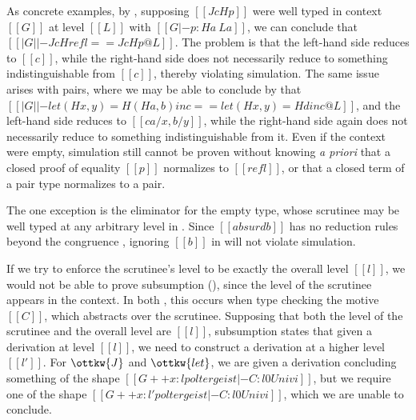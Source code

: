 \documentclass[acmsmall, screen=true, nonacm=true,
  review=\ifpublic false\else true\fi,
  anonymous=\ifanonymous true\else false\fi
]{acmart}
\makeatletter
\newcommand{\apriori}{\textit{a priori}\@\xspace}
\makeatother
\begin{document}
As concrete examples, by ,
supposing $[[J c H p]]$ were well typed in context $[[G]]$
at level $[[L]]$ with $[[G |- p : H a ~ L a]]$,
we can conclude that $[[| G | |- J c H refl == J c H p @ L]]$.
The problem is that the left-hand side reduces to $[[c]]$,
while the right-hand side does not necessarily reduce to something indistinguishable from $[[c]]$,
thereby violating simulation.
The same issue arises with pairs, where we may be able to conclude by  that
$[[| G | |- let (H x, y) = H (H a, b) in c == let (H x, y) = H d in c @ L]]$,
and the left-hand side reduces to $[[c {a / x, b / y}]]$,
while the right-hand side again does not necessarily reduce to something indistinguishable from it.
Even if the context were empty, simulation still cannot be proven
without knowing \apriori that a closed proof of equality $[[p]]$ normalizes to $[[refl]]$,
or that a closed term of a pair type normalizes to a pair.

The one exception is the eliminator for the empty type,
whose scrutinee may be well typed at any arbitrary level in .
Since $[[absurd b]]$ has no reduction rules beyond the congruence ,
ignoring $[[b]]$ in  will not violate simulation.

If we try to enforce the scrutinee's level
to be exactly the overall level $[[l]]$,
we would not be able to prove subsumption (),
since the level of the scrutinee appears in the context.
In both , this occurs when type checking the motive $[[C]]$,
which abstracts over the scrutinee.
Supposing that both the level of the scrutinee and the overall level are $[[l]]$,
subsumption states that given a derivation at level $[[l]]$,
we need to construct a derivation at a higher level $[[l']]$.
For $\ottkw{J}$ and $\ottkw{let}$,
we are given a derivation concluding something of the shape
$[[G ++ x : l poltergeist |- C : l0 Univ i]]$,
but we require one of the shape
$[[G ++ x : l' poltergeist |- C : l0 Univ i]]$,
which we are unable to conclude.

\end{document}
